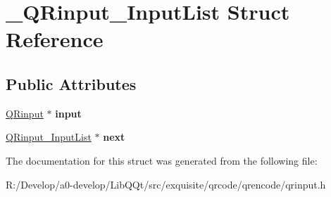\hypertarget{struct___q_rinput___input_list}{}\section{\+\_\+\+Q\+Rinput\+\_\+\+Input\+List Struct Reference}
\label{struct___q_rinput___input_list}
\subsection*{Public Attributes}
\begin{DoxyCompactItemize}
\item 
\mbox{\label{struct___q_rinput___input_list_ae8c7eebe23d1033e193195f6dea36d97}} 
\mbox{\hyperlink{struct___q_rinput}{Q\+Rinput}} $\ast$ {\bfseries input}
\item 
\mbox{\label{struct___q_rinput___input_list_a46c3a7b29f71a09746191d8afb8e20fd}} 
\mbox{\hyperlink{struct___q_rinput___input_list}{Q\+Rinput\+\_\+\+Input\+List}} $\ast$ {\bfseries next}
\end{DoxyCompactItemize}


The documentation for this struct was generated from the following file\+:\begin{DoxyCompactItemize}
\item 
R\+:/\+Develop/a0-\/develop/\+Lib\+Q\+Qt/src/exquisite/qrcode/qrencode/qrinput.\+h\end{DoxyCompactItemize}
